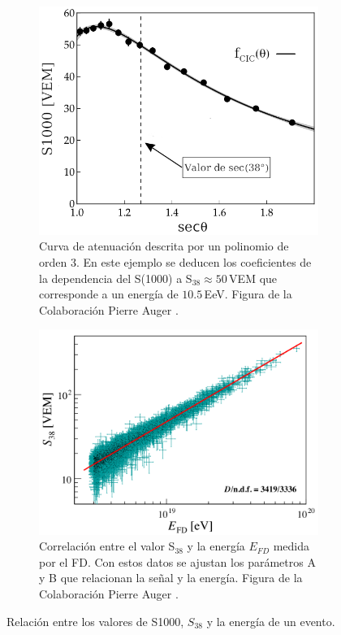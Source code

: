 \begin{figure}[H]
	\centering
	\begin{subfigure}[t]{0.46\textwidth}
		\includegraphics[width=\textwidth]{s1000_theta.png}
		\caption{Curva de atenuación descrita por un polinomio de orden 3. En este ejemplo se deducen los coeficientes de la dependencia del S(1000) a S$_{38}\approx 50\,$VEM que corresponde a un energía de $10.5\,$EeV. Figura de la Colaboración Pierre Auger \cite{como_funciona_auger}.} 	\label{fig:s1000_theta}    \end{subfigure}%
    \hspace{\fill}
    \begin{subfigure}[t]{0.51\textwidth}
		\includegraphics[width=\textwidth]{efd_s38_v2.jpg}
		\caption{Correlación entre el valor S$_{38}$ y la energía $E_{FD}$ medida por el FD. Con estos datos se ajustan los parámetros A y B que relacionan la señal y la energía.  Figura de la Colaboración Pierre Auger \cite{tobepublished}.} 	\label{fig:efd_s38}
    \end{subfigure}%
    \caption{Relación entre los valores de S1000, $S_{38}$ y la energía de un evento.}
\end{figure}


